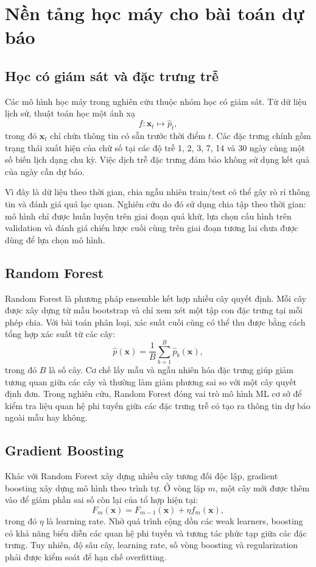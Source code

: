 \section{Nền tảng học máy cho bài toán dự báo}
\subsection{Học có giám sát và đặc trưng trễ}
Các mô hình học máy trong nghiên cứu thuộc nhóm học có giám sát. Từ dữ liệu lịch sử, thuật toán học một ánh xạ
\[
f:\mathbf x_t\mapsto \hat p_t,
\]
trong đó $\mathbf x_t$ chỉ chứa thông tin có sẵn trước thời điểm $t$. Các đặc trưng chính gồm trạng thái xuất hiện của chữ số tại các độ trễ 1, 2, 3, 7, 14 và 30 ngày cùng một số biến lịch dạng chu kỳ. Việc dịch trễ đặc trưng đảm bảo không sử dụng kết quả của ngày cần dự báo.

Vì đây là dữ liệu theo thời gian, chia ngẫu nhiên train/test có thể gây rò rỉ thông tin và đánh giá quá lạc quan. Nghiên cứu do đó sử dụng chia tập theo thời gian: mô hình chỉ được huấn luyện trên giai đoạn quá khứ, lựa chọn cấu hình trên validation và đánh giá chiến lược cuối cùng trên giai đoạn tương lai chưa được dùng để lựa chọn mô hình.

\subsection{Random Forest}
Random Forest là phương pháp ensemble kết hợp nhiều cây quyết định. Mỗi cây được xây dựng từ mẫu bootstrap và chỉ xem xét một tập con đặc trưng tại mỗi phép chia. Với bài toán phân loại, xác suất cuối cùng có thể thu được bằng cách tổng hợp xác suất từ các cây:
\[
\hat p(\mathbf x)=\frac{1}{B}\sum_{b=1}^{B}\hat p_b(\mathbf x),
\]
trong đó $B$ là số cây. Cơ chế lấy mẫu và ngẫu nhiên hóa đặc trưng giúp giảm tương quan giữa các cây và thường làm giảm phương sai so với một cây quyết định đơn. Trong nghiên cứu, Random Forest đóng vai trò mô hình ML cơ sở để kiểm tra liệu quan hệ phi tuyến giữa các đặc trưng trễ có tạo ra thông tin dự báo ngoài mẫu hay không.

\subsection{Gradient Boosting}
Khác với Random Forest xây dựng nhiều cây tương đối độc lập, gradient boosting xây dựng mô hình theo trình tự. Ở vòng lặp $m$, một cây mới được thêm vào để giảm phần sai số còn lại của tổ hợp hiện tại:
\[
F_m(\mathbf x)=F_{m-1}(\mathbf x)+\eta f_m(\mathbf x),
\]
trong đó $\eta$ là learning rate. Nhờ quá trình cộng dồn các weak learners, boosting có khả năng biểu diễn các quan hệ phi tuyến và tương tác phức tạp giữa các đặc trưng. Tuy nhiên, độ sâu cây, learning rate, số vòng boosting và regularization phải được kiểm soát để hạn chế overfitting.


